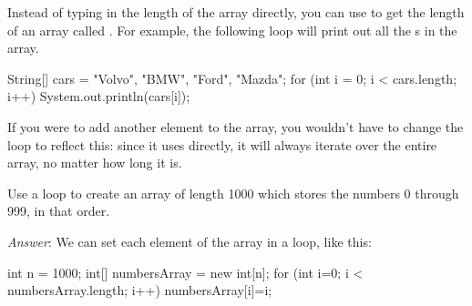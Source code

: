Instead of typing in the length of the array directly, you can use  to get the length of an array called . For example, the following  loop will print out all the s in the  array.
\begin{code}
String[] cars = {"Volvo", "BMW", "Ford", "Mazda"};
for (int i = 0; i < cars.length; i++) {
  System.out.println(cars[i]);
}
\end{code}
If you were to add another element to the  array, you wouldn't have to change the  loop to reflect this: since it uses  directly, it will always iterate over the entire array, no matter how long it is.

\begin{example}
Use a  loop to create an array of length 1000 which stores the numbers 0 through 999, in that order.

\noindent\emph{Answer}: We can set each element of the array in a  loop, like this:
\begin{code}
int n = 1000;
int[] numbersArray = new int[n];
for (int i=0; i < numbersArray.length; i++) {
  numbersArray[i]=i;
}
\end{code}
\end{example}

